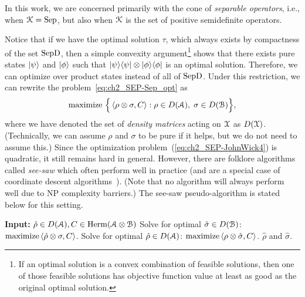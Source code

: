 In this work, we are concerned primarily with the cone of \emph{separable operators}, i.e., when $\mathcal{K} = \mathrm{Sep}$, but also when $\mathcal{K}$ is the set of positive semidefinite operators.%

Notice that if we have the optimal solution $\tau$, which always exists by compactness of the set $\mathrm{SepD}$, then a simple convexity argument\footnote{If an optimal solution is a convex combination of feasible solutions, then one of those feasible solutions has objective function value at least as good as the original optimal solution.} shows that there exists pure states $\ket{\psi}$ and $\ket{\phi}$ such that $| \psi \rangle \langle \psi | \otimes | \phi \rangle \langle \phi |$ is an optimal solution.   
Therefore, we can optimize over product states instead of all of $\mathrm{SepD}$. 
Under this restriction, we can rewrite the problem~\eqref{eq:ch2_SEP-Sep_opt} as 
\begin{equation} \label{eq:ch2_SEP-JohnWick4}
\text{maximize } \Big\{ \left\langle \rho \otimes \sigma, C \right\rangle : \rho \in D(\mathcal{A}), \; \sigma \in D(\mathcal{B}) \Big\},   
\end{equation}  
where we have denoted the set of \emph{density matrices} acting on $\mathcal{X}$ as $D(\mathcal{X})$. 
(Technically, we can assume $\rho$ and $\sigma$ to be pure if it helps, but we do not need to assume this.)  
Since the optimization problem~(\ref{eq:ch2_SEP-JohnWick4}) is quadratic, it still remains hard in general. 
However, there are folklore algorithms called \emph{see-saw} which often perform well in practice (and are a special case of coordinate descent algorithms~\cite{wright2015coordinate}).
(Note that no algorithm will always perform well due to NP complexity barriers.)   
The see-saw pseudo-algorithm is stated below for this setting.%

\begin{algorithm}[htpb]
    \caption{See-saw}\label{algo:ch2_SEP-see-saw}
    \begin{algorithmic}[1]
        \State\textbf{Input:} $\hat{\rho} \in D(\mathcal{A}), C \in \operatorname{Herm}(\mathcal{A} \otimes \mathcal{B})$ 
        \Repeat
            \State Solve for optimal $\hat{\sigma} \in D(\mathcal{B})$: $\mathrm{maximize} \left\langle \hat{\rho} \otimes \sigma, C \right\rangle$. 
            \State Solve for optimal $\hat{\rho} \in D(\mathcal{A})$: $\mathrm{maximize} \left\langle \rho \otimes \hat{\sigma}, C \right\rangle$. 
        \State\Return $\hat{\rho}$ and $\hat{\sigma}$. 
    \end{algorithmic} 
\end{algorithm} 
  
